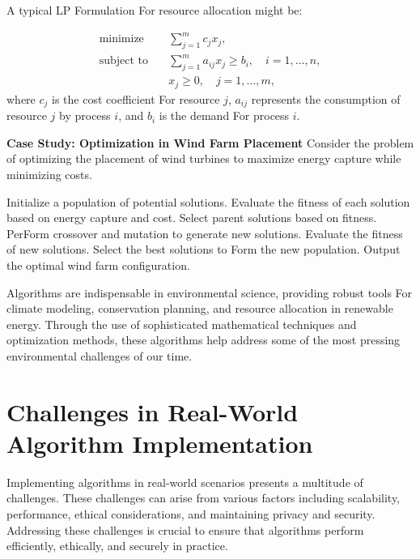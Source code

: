 \documentclass[12pt]{book} %
\begin{document}
A typical LP Formulation For resource allocation might be:

\begin{align}
    \text{minimize} \quad & \sum_{j=1}^{m} c_j x_j, \\
    \text{subject to} \quad & \sum_{j=1}^{m} a_{ij} x_j \geq b_i, \quad i = 1, \ldots, n, \\
    & x_j \geq 0, \quad j = 1, \ldots, m,
\end{align}
where $c_j$ is the cost coefficient For resource $j$, $a_{ij}$ represents the consumption of resource $j$ by process $i$, and $b_i$ is the demand For process $i$.

\textbf{Case Study: Optimization in Wind Farm Placement}
Consider the problem of optimizing the placement of wind turbines to maximize energy capture while minimizing costs.
\FloatBarrier
\begin{algorithm}
\caption{Genetic Algorithm For Wind Farm Placement}
\begin{algorithmic}[1]
\State Initialize a population of potential solutions.
\State Evaluate the fitness of each solution based on energy capture and cost.
    \State Select parent solutions based on fitness.
    \State PerForm crossover and mutation to generate new solutions.
    \State Evaluate the fitness of new solutions.
    \State Select the best solutions to Form the new population.
\EndFor
\State Output the optimal wind farm configuration.
\end{algorithmic}
\end{algorithm}
\FloatBarrier

Algorithms are indispensable in environmental science, providing robust tools For climate modeling, conservation planning, and resource allocation in renewable energy. Through the use of sophisticated mathematical techniques and optimization methods, these algorithms help address some of the most pressing environmental challenges of our time.


\section{Challenges in Real-World Algorithm Implementation}
Implementing algorithms in real-world scenarios presents a multitude of challenges. These challenges can arise from various factors including scalability, performance, ethical considerations, and maintaining privacy and security. Addressing these challenges is crucial to ensure that algorithms perform efficiently, ethically, and securely in practice.
\end{document}
